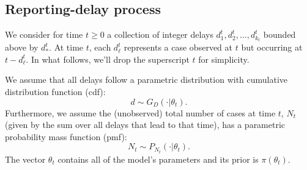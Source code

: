 \documentclass[12pt]{article}
\begin{document}


\subsection{Reporting-delay process}

We consider for time $t \geq 0$ a collection of integer delays $d_1^t, d_2^t, \dots, d_{k_t}^t$ bounded above by $d_*^{t}$. At time $t$, each $d_{\ell}^t$ represents a case observed at $t$ but occurring at $t - d_{\ell}^t$. In what follows, we'll drop the superscript $t$ for simplicity. 

We assume that all delays follow a parametric distribution with cumulative distribution function (cdf):
\begin{equation}
d \sim G_D(\cdot|\theta_t).
\end{equation}
Furthermore, we assume the (unobserved) total number of cases at time $t$, $N_t$ (given by the sum over all  delays that lead to that time), has a parametric probability mass function (pmf): 
\begin{equation}
N_t \sim P_{N_t}(\cdot|\theta_t).
\end{equation}
The vector $\theta_t$ contains all of the model's parameters and its prior is $\pi(\theta_t)$. 
\end{document}
